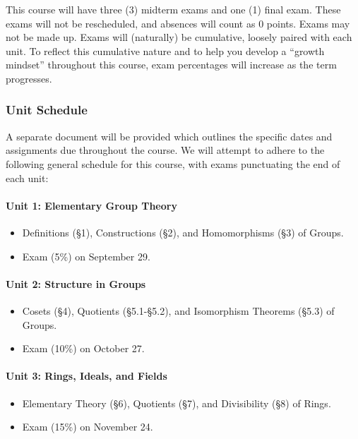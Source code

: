 \documentclass[
  twoside]{article}
\providecommand{\tightlist}{%
  \setlength{\itemsep}{0pt}\setlength{\parskip}{0pt}}
\begin{document}
This course will have three (3) midterm exams and one (1) final exam.
These exams will not be rescheduled, and absences will count as 0
points. Exams may not be made up. Exams will (naturally) be cumulative,
loosely paired with each unit. To reflect this cumulative nature and to
help you develop a ``growth mindset'' throughout this course, exam
percentages will increase as the term progresses.

\subsubsection{Unit Schedule}\label{unit-schedule}

A separate document will be provided which outlines the specific dates
and assignments due throughout the course. We will attempt to adhere to
the following general schedule for this course, with exams punctuating
the end of each unit:

\paragraph{Unit 1: Elementary Group
Theory}\label{unit-1-elementary-group-theory}

\begin{itemize}
\tightlist
\item
  Definitions (§1), Constructions (§2), and Homomorphisms (§3) of
  Groups.
\item
  Exam (5\%) on September 29.
\end{itemize}

\paragraph{Unit 2: Structure in
Groups}\label{unit-2-structure-in-groups}

\begin{itemize}
\tightlist
\item
  Cosets (§4), Quotients (§5.1-§5.2), and Isomorphism Theorems (§5.3) of
  Groups.
\item
  Exam (10\%) on October 27.
\end{itemize}

\paragraph{Unit 3: Rings, Ideals, and
Fields}\label{unit-3-rings-ideals-and-fields}

\begin{itemize}
\tightlist
\item
  Elementary Theory (§6), Quotients (§7), and Divisibility (§8) of
  Rings.
\item
  Exam (15\%) on November 24.
\end{itemize}
\end{document}

